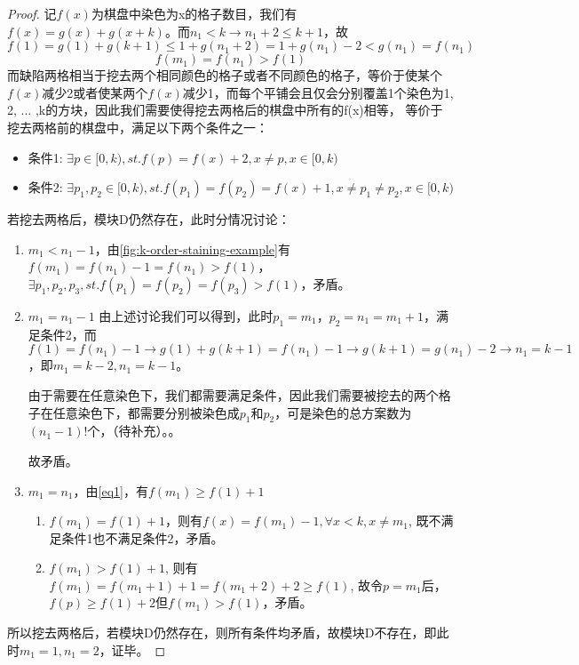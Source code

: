 \begin{proof}
    记$f(x)$为棋盘中染色为x的格子数目，我们有$f(x) = g(x) + g(x + k)$。而$n_1 < k \rightarrow n_1 + 2 \le k + 1$，故
    $f(1) = g(1) + g(k + 1) \le 1 + g(n_1 + 2) = 1 + g(n_1) - 2 < g(n_1) = f(n_1)$
    \begin{equation}
        \label{eq1}
        f(m_1) = f(n_1) > f(1)
    \end{equation}
    而缺陷两格相当于挖去两个相同颜色的格子或者不同颜色的格子，等价于使某个$f(x)$减少2或者使某两个$f(x)$减少1，而每个平铺会且仅会分别覆盖1个染色为1, 2, ... ,k的方块，因此我们需要使得挖去两格后的棋盘中所有的f(x)相等，
    等价于挖去两格前的棋盘中，满足以下两个条件之一：
    \begin{itemize}
        \item 条件1: $\exists p \in [0, k), st. f(p) = f(x) + 2, x \neq p , x \in [0, k)$
        \item 条件2: $\exists p_1, p_2 \in [0, k), st. f(p_1) = f(p_2) = f(x) + 1, x \neq p_1 \neq p_2, x \in [0, k)$
    \end{itemize}
    若挖去两格后，模块D仍然存在，此时分情况讨论：

    \begin{enumerate}
        \item $m_1 < n_1 - 1$，由\ref*{fig:k-order-staining-example}有$f(m_1) = f(n_1) - 1 = f(n_1) > f(1)$，$\exists p_1, p_2, p_3, st. f(p_1) = f(p_2) = f(p_3) > f(1)$，矛盾。
        \item $m_1 = n_1 - 1$ 由上述讨论我们可以得到，此时$p_1 = m_1$，$p_2 = n_1 = m_1 + 1$，满足条件2，而$f(1) = f(n_1) - 1 \rightarrow g(1) + g(k + 1) = f(n_1) - 1 \rightarrow g(k + 1) = g(n_1) - 2 \rightarrow n_1 = k-1$
              ，即$m_1 = k - 2, n_1 = k - 1$。

              由于需要在任意染色下，我们都需要满足条件，因此我们需要被挖去的两个格子在任意染色下，都需要分别被染色成$p_1$和$p_2$，可是染色的总方案数为$(n_1 - 1)!$个，（待补充）。。

              故矛盾。
        \item $m_1 = n_1$，由\ref*{eq1}，有$f(m_1) \ge f(1) + 1$
              \begin{enumerate}
                  \item $f(m_1) = f(1) + 1$，则有$f(x) = f(m_1) - 1, \forall x < k, x \neq m_1$, 既不满足条件1也不满足条件2，矛盾。
                  \item $f(m_1) > f(1) + 1$, 则有$f(m_1) = f(m_1 + 1) + 1 = f(m_1 + 2) + 2 \ge f(1)$, 故令$p = m_1$后，$f(p) \ge f(1) + 2$但$f(m_1) > f(1)$，矛盾。
              \end{enumerate}
    \end{enumerate}
    
    所以挖去两格后，若模块D仍然存在，则所有条件均矛盾，故模块D不存在，即此时$m_1 = 1, n_1 = 2$，证毕。
\end{proof}